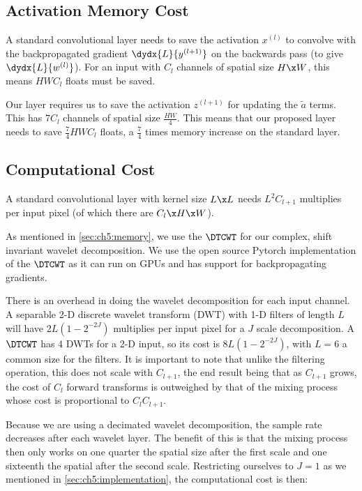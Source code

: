 \subsection{Activation Memory Cost}
A standard convolutional layer needs to save the activation $x^{(l)}$ to
convolve with the backpropagated gradient $\dydx{L}{y^{(l+1)}}$ on the backwards
pass (to give $\dydx{L}{w^{(l)}}$). For an input with $C_l$ channels of spatial size $H\x W$, this means
$HWC_l$ floats must be saved. 

Our layer requires us to save the activation
$z^{(l+1)}$ for updating the $\tilde{a}$ terms. This has $7C_l$ channels of
spatial size $\frac{HW}{4}$. This means that our proposed layer needs to save
$\frac{7}{4}HWC_l$ floats, a $\frac{7}{4}$ times memory increase on the standard
layer.



\subsection{Computational Cost}\label{sec:ch5:computation}
A standard convolutional layer with kernel size $L\x L$ needs $L^2C_{l+1}$
multiplies per input pixel (of which there are $C_{l}\x H\x W$).

As mentioned in \autoref{sec:ch5:memory}, we use the $\DTCWT$ for our complex, shift
invariant wavelet decomposition. We use the open source Pytorch implementation
of the $\DTCWT$ \cite{cotter_pytorch_2018} as it can run on GPUs and
has support for backpropagating gradients.

There is an overhead in doing the wavelet decomposition for each input channel.
A separable 2-D discrete wavelet transform (DWT) with 1-D filters of length $L$
will have $2L\left(1-2^{-2J}\right)$ multiplies per input pixel for a $J$ scale
decomposition. A $\DTCWT$ has 4 DWTs for a 2-D input, so its cost is
$8L\left(1-2^{-2J}\right)$, with $L=6$ a common size for the filters. It is
important to note that unlike the filtering operation, this does not scale with
$C_{l+1}$, the end result being that as $C_{l+1}$ grows, the cost of $C_l$
forward transforms is outweighed by that of the mixing process whose cost is
proportional to $C_l C_{l+1}$.

Because we are using a decimated wavelet decomposition, the sample rate
decreases after each wavelet layer. The benefit of this is that the mixing
process then only works on one quarter the spatial size after the first scale
and one sixteenth the spatial after the second scale. Restricting ourselves to
$J=1$ as we mentioned in \autoref{sec:ch5:implementation}, the computational cost is
then:

